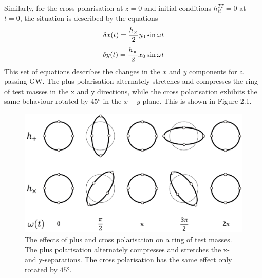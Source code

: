 \documentclass[binding=0.6cm, LaM]{sapthesis}
\begin{document}
        Similarly, for the cross polarisation at $z=0$ and initial conditions $h_{ii}^{TT} = 0$ at $t= 0$, the situation is described by the equations
        \begin{equation}
          \delta x(t) =  {{h_{\times}} \over 2} y_0 \sin \omega t
        \end{equation}
        \begin{equation}
          \delta y(t) =  {{h_{\times}} \over 2} x_0  \sin \omega t
        \end{equation}
        This set of equations describes the changes in the $x$ and $y$ components for a passing GW.
        The plus polarisation alternately stretches and compresses the ring of test masses in the x and y directions,
        while the cross polarisation exhibits the same behaviour rotated by $\ang{45}$ in the $x - y$ plane. This is shown in Figure 2.1.
        \begin{figure}[t]
          \label{ring}
          \includegraphics[scale=1]{ring}
          \centering
          \caption{The effects of plus and cross polarisation on a ring of test masses. The plus polarisation alternately compresses and stretches the x- and y-separations. The cross polarisation has the same effect only rotated by  $\ang{45}$.}
          \label{fig:ring}
        \end{figure}
\end{document}
